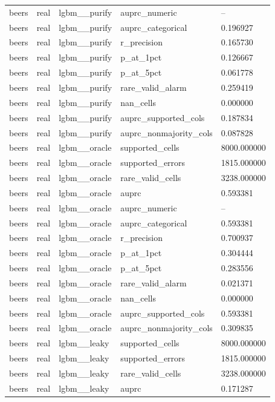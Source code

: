 \begin{tabular}{lllll}
beers & real & lgbm\_\_purify & auprc\_numeric & -- \\
beers & real & lgbm\_\_purify & auprc\_categorical & 0.196927 \\
beers & real & lgbm\_\_purify & r\_precision & 0.165730 \\
beers & real & lgbm\_\_purify & p\_at\_1pct & 0.126667 \\
beers & real & lgbm\_\_purify & p\_at\_5pct & 0.061778 \\
beers & real & lgbm\_\_purify & rare\_valid\_alarm & 0.259419 \\
beers & real & lgbm\_\_purify & nan\_cells & 0.000000 \\
beers & real & lgbm\_\_purify & auprc\_supported\_cols & 0.187834 \\
beers & real & lgbm\_\_purify & auprc\_nonmajority\_cols & 0.087828 \\
beers & real & lgbm\_\_oracle & supported\_cells & 8000.000000 \\
beers & real & lgbm\_\_oracle & supported\_errors & 1815.000000 \\
beers & real & lgbm\_\_oracle & rare\_valid\_cells & 3238.000000 \\
beers & real & lgbm\_\_oracle & auprc & 0.593381 \\
beers & real & lgbm\_\_oracle & auprc\_numeric & -- \\
beers & real & lgbm\_\_oracle & auprc\_categorical & 0.593381 \\
beers & real & lgbm\_\_oracle & r\_precision & 0.700937 \\
beers & real & lgbm\_\_oracle & p\_at\_1pct & 0.304444 \\
beers & real & lgbm\_\_oracle & p\_at\_5pct & 0.283556 \\
beers & real & lgbm\_\_oracle & rare\_valid\_alarm & 0.021371 \\
beers & real & lgbm\_\_oracle & nan\_cells & 0.000000 \\
beers & real & lgbm\_\_oracle & auprc\_supported\_cols & 0.593381 \\
beers & real & lgbm\_\_oracle & auprc\_nonmajority\_cols & 0.309835 \\
beers & real & lgbm\_\_leaky & supported\_cells & 8000.000000 \\
beers & real & lgbm\_\_leaky & supported\_errors & 1815.000000 \\
beers & real & lgbm\_\_leaky & rare\_valid\_cells & 3238.000000 \\
beers & real & lgbm\_\_leaky & auprc & 0.171287 \\

\end{tabular}
